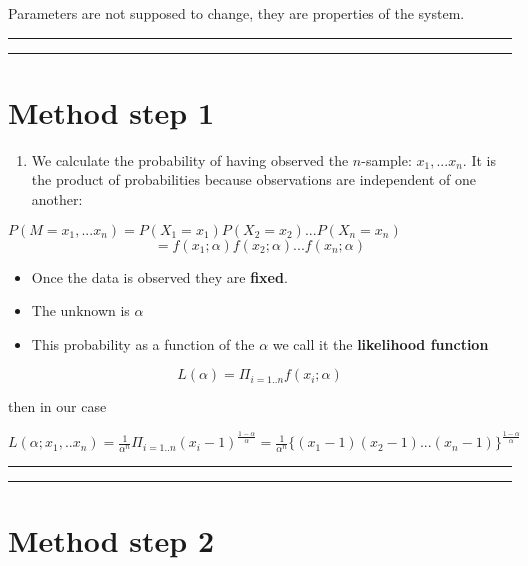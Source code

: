 \documentclass[
]{book}
\providecommand{\tightlist}{%
  \setlength{\itemsep}{0pt}\setlength{\parskip}{0pt}}
\begin{document}
Parameters are not supposed to change, they are properties of the system.

\begin{center}\rule{0.5\linewidth}{0.5pt}\end{center}

\begin{center}\rule{0.5\linewidth}{0.5pt}\end{center}

\hypertarget{method-step-1}{%
\section{Method step 1}\label{method-step-1}}

\begin{enumerate}
\def\labelenumi{\arabic{enumi}.}
\tightlist
\item
  We calculate the probability of having observed the \(n\)-sample: \(x_1,...x_n\). It is the product of probabilities because observations are independent of one another:
\end{enumerate}

\(P(M=x_1,...x_n)=P(X_1=x_1)P(X_2=x_2)...P(X_n=x_n)\)
\[=f(x_1;\alpha)f(x_2;\alpha) ...f(x_n;\alpha)\]

\begin{itemize}
\tightlist
\item
  Once the data is observed they are \textbf{fixed}.
\item
  The unknown is \(\alpha\)
\item
  This probability as a function of the \(\alpha\) we call it the \textbf{likelihood function}
\end{itemize}

\[L(\alpha)= \Pi_{i=1..n} f(x_i; \alpha)\]

then in our case

\(L(\alpha;x_1,..x_n)= \frac{1}{\alpha^n} \Pi_{i=1..n} (x_i-1)^{\frac{1-\alpha}{\alpha}}= \frac{1}{\alpha^n} \{(x_1-1)(x_2-1)...(x_n-1)\}^{\frac{1-\alpha}{\alpha}}\)

\begin{center}\rule{0.5\linewidth}{0.5pt}\end{center}

\begin{center}\rule{0.5\linewidth}{0.5pt}\end{center}

\hypertarget{method-step-2}{%
\section{Method step 2}\label{method-step-2}}
\end{document}
